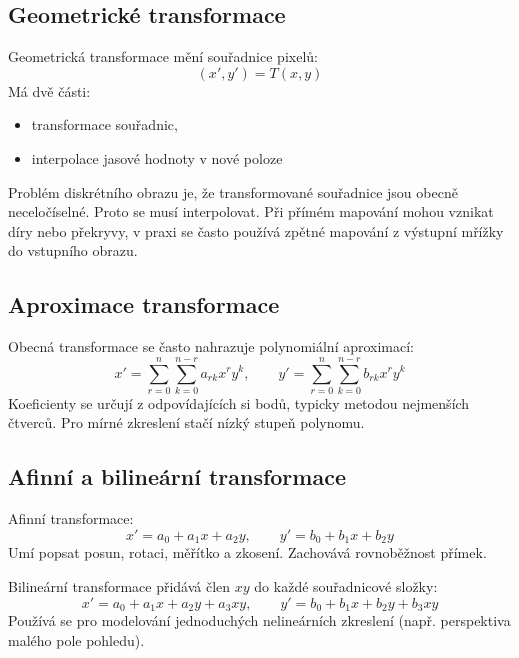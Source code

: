 \subsection*{Geometrické transformace}
Geometrická transformace mění souřadnice pixelů:
\begin{equation}
    (x',y') = T(x,y)
\end{equation}
Má dvě části:
\begin{itemize}
    \item transformace souřadnic,
    \item interpolace jasové hodnoty v nové poloze
\end{itemize}
Problém diskrétního obrazu je, že transformované souřadnice jsou obecně neceločíselné. Proto se musí interpolovat.
Při přímém mapování mohou vznikat díry nebo překryvy, v praxi se často používá zpětné mapování z výstupní mřížky do vstupního obrazu.

\subsection*{Aproximace transformace}
Obecná transformace se často nahrazuje polynomiální aproximací:
\begin{equation}
    x'=\sum_{r=0}^{n}\sum_{k=0}^{n-r}a_{rk}x^r y^k,\qquad
    y'=\sum_{r=0}^{n}\sum_{k=0}^{n-r}b_{rk}x^r y^k
\end{equation}
Koeficienty se určují z odpovídajících si bodů, typicky metodou nejmenších čtverců.
Pro mírné zkreslení stačí nízký stupeň polynomu.

\subsection*{Afinní a bilineární transformace}
Afinní transformace:
\begin{equation}
    x'=a_0+a_1x+a_2y,\qquad y'=b_0+b_1x+b_2y
\end{equation}
Umí popsat posun, rotaci, měřítko a zkosení. Zachovává rovnoběžnost přímek.

Bilineární transformace přidává člen \(xy\) do každé souřadnicové složky:
\begin{equation}
    x'=a_0+a_1x+a_2y+a_3xy,\qquad y'=b_0+b_1x+b_2y+b_3xy
\end{equation}
Používá se pro modelování jednoduchých nelineárních zkreslení (např. perspektiva malého pole pohledu).

